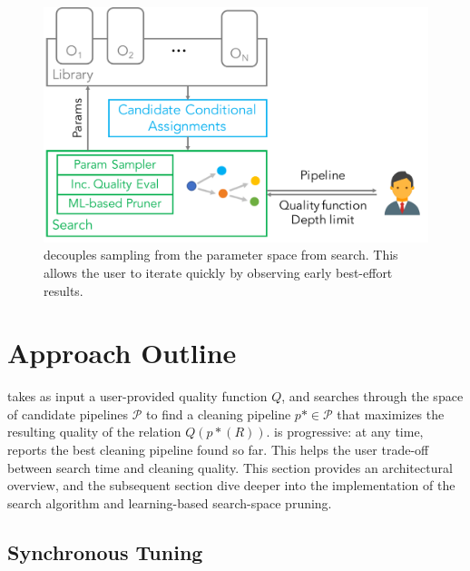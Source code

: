 \begin{figure}[t]
\centering
 \includegraphics[width=0.7\columnwidth]{figures/arch}
 \caption{\small \sys decouples sampling from the parameter space from search. This allows the user to iterate quickly by observing early best-effort results. \label{fig:arch}}
\end{figure}



\section{Approach Outline}

\sys takes as input a user-provided quality function $Q$, and searches through the space of candidate pipelines $\mathcal{P}$ to find a cleaning pipeline $p*\in\mathcal{P}$ that maximizes the resulting quality of the relation $Q(p*(R))$.  \sys is progressive: at any time, \sys reports the best cleaning pipeline found so far.  This helps the user trade-off between search time and cleaning quality.  This section provides an architectural overview, and the subsequent section dive deeper into the implementation of the search algorithm and learning-based search-space pruning.





\subsection{Synchronous Tuning}

